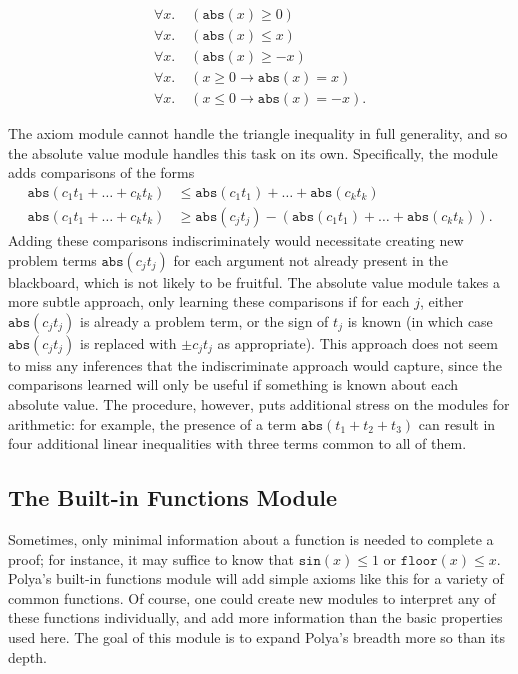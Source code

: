 \documentclass[runningheds]{llncs}
\newcommand{\fn}[1]{\mathtt{#1}} \newcommand{\nroot}{\fn{root}}
\newcommand{\abs}{\fn{abs}}
\begin{document}
\begin{align*}
 \forall x. \; &(\abs(x) \geq 0) \\
 \forall x. \; &(\abs(x) \leq x) \\
 \forall x. \; &(\abs(x) \geq -x) \\
 \forall x. \; &(x \geq 0 \to \abs(x) = x) \\
 \forall x. \; &(x \leq 0 \to \abs(x) = -x). 
\end{align*}

The axiom module cannot handle the triangle inequality in full generality, and so the absolute value module handles this task on its own. Specifically, the module adds comparisons of the forms
\begin{align*}
 \abs(c_1t_1 + \ldots + c_k t_k) & \leq \abs(c_1 t_1) + \ldots + \abs(c_k t_k) \\
 \abs(c_1t_1 + \ldots + c_k t_k) & \geq \abs(c_j t_j) - \left( \abs(c_1 t_1) + \ldots + \abs(c_k t_k) \right).
\end{align*}
Adding these comparisons indiscriminately would necessitate creating new problem terms $\abs(c_j t_j)$ for each argument not already present in the blackboard, which is not likely to be fruitful. The absolute value module takes a more subtle approach, only learning these comparisons if for each $j$, either $\abs(c_j t_j)$ is already a problem term, or the sign of $t_j$ is known (in which case $\abs(c_j t_j)$ is replaced with $\pm c_j t_j$ as appropriate). This approach does not seem to miss any inferences that the indiscriminate approach would capture, since the comparisons learned will only be useful if something is known about each absolute value. The procedure, however, puts additional stress on the modules for arithmetic: for example, the presence of a term $\abs(t_1 + t_2 + t_3)$ can result in four additional linear inequalities with three terms common to all of them.

\subsection{The Built-in Functions Module}
Sometimes, only minimal information about a function is needed to complete a proof; for instance, it may suffice to know that $\fn{sin}(x) \le 1$ or $\fn{floor}(x) \le x$. Polya's built-in functions module will add simple axioms like this for a variety of common functions. Of course, one could create new modules to interpret any of these functions individually, and add more information than the basic properties used here. The goal of this module is to expand Polya's breadth more so than its depth.
\end{document}
